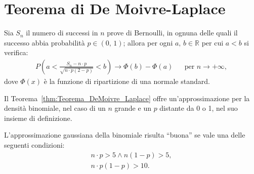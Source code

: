     \section{Teorema di De Moivre-Laplace}
        \begin{thm}\label{thm:Teorema_DeMoivre_Laplace}
            Sia $S_n$ il numero di successi in $n$ prove di Bernoulli, in ognuna delle quali il successo abbia probabilità $p \in (0,\,1)$; allora per ogni $a,\,b \in \mathbb{R}$ per cui $a < b$ si verifica:
            \begin{align*}
                P\left(a < \frac{S_n - n\cdot p}{\sqrt{n\cdot p(2-p)}} < b\right) \rightarrow \Phi(b) - \Phi(a) & & \text{per }n \rightarrow +\infty
            ,\end{align*}
            dove $\Phi(x)$ è la funzione di ripartizione di una normale standard.
        \end{thm}
        \begin{obsv}
            Il Teorema~\ref{thm:Teorema_DeMoivre_Laplace} offre un'approssimazione per la densità binomiale, nel caso di un $n$ grande e un $p$ distante da 0 o 1, nel suo insieme di definizione.

            L'approssimazione gaussiana della binomiale risulta ``buona'' se vale una delle seguenti condizioni:
            \begin{gather*}
                n \cdot p > 5 \land n(1-p) > 5, \\
                n \cdot p (1 - p) > 10.
            \end{gather*}
        \end{obsv}
